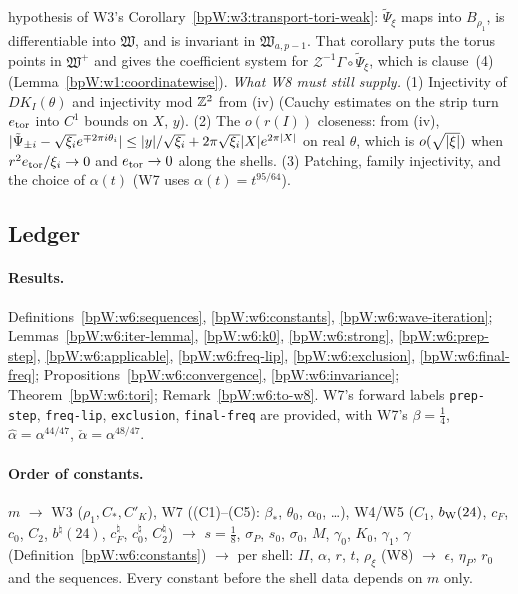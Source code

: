 \begin{remark}
hypothesis of W3's Corollary~\ref{bpW:w3:transport-tori-weak}: $\tilde\Psi_\xi$ maps into $B_{\rho_1}$, is differentiable into $\mathfrak W$,
and is invariant in $\mathfrak W_{a,p-1}$. That corollary puts the torus points in $\mathfrak W^+$ and gives the coefficient system
for $\mathcal Z^{-1}\Gamma\circ\tilde\Psi_\xi$, which is clause~(4) (Lemma~\ref{bpW:w1:coordinatewise}).
\emph{What W8 must still supply.} (1) Injectivity of $D K_I(\theta)$ and injectivity mod
$\mathbb{Z}^2$ from (iv) (Cauchy estimates on the strip turn $e_{\rm tor}$ into $C^1$ bounds on $X$, $y$). (2) The $o(r(I))$ closeness: from (iv),
$\lvert \tilde\Psi_{\pm i}-\sqrt{\xi_i}e^{\mp2\pi i\theta_i}\rvert\le\lvert y\rvert/\sqrt{\xi_i}+2\pi\sqrt{\xi_i}\lvert X\rvert e^{2\pi\lvert X\rvert}$ on real $\theta$, which is
$o(\sqrt{\lvert \xi\rvert})$ when $r^2e_{\rm tor}/\xi_i\to0$ and $e_{\rm tor}\to0$ along the shells. (3) Patching, family injectivity, and the choice
of $\alpha(t)$ (W7 uses $\alpha(t)=t^{95/64}$).
\end{remark}

\subsection{Ledger}\label{bpW:w6:ledger}

\paragraph{Results.} Definitions~\ref{bpW:w6:sequences}, \ref{bpW:w6:constants}, \ref{bpW:w6:wave-iteration};
Lemmas~\ref{bpW:w6:iter-lemma}, \ref{bpW:w6:k0}, \ref{bpW:w6:strong}, \ref{bpW:w6:prep-step}, \ref{bpW:w6:applicable},
\ref{bpW:w6:freq-lip}, \ref{bpW:w6:exclusion}, \ref{bpW:w6:final-freq}; Propositions~\ref{bpW:w6:convergence}, \ref{bpW:w6:invariance};
Theorem~\ref{bpW:w6:tori}; Remark~\ref{bpW:w6:to-w8}. W7's forward labels \texttt{prep-step}, \texttt{freq-lip}, \texttt{exclusion},
\texttt{final-freq} are provided, with W7's $\beta=\frac14$, $\hat\alpha=\alpha^{44/47}$, $\check\alpha=\alpha^{48/47}$.

\paragraph{Order of constants.} $m$ $\to$ W3 ($\rho_1,C_*,C'_K$), W7 ((C1)--(C5): $\beta_*$, $\theta_0$, $\alpha_0$, \dots), W4/W5 ($C_1$, $b_{\rm W}(24)$,
$c_F$, $c_0$, $C_2$, $b^\natural(24)$, $c^\natural_F$, $c^\natural_0$, $C^\natural_2$) $\to$ $s=\frac18$, $\sigma_P$, $s_0$, $\sigma_0$, $M$, $\gamma_0$, $K_0$, $\gamma_1$, $\gamma$ (Definition~\ref{bpW:w6:constants})
$\to$ per shell: $\Pi$, $\alpha$, $r$, $t$, $\rho_\xi$ (W8) $\to$ $\epsilon$, $\eta_P$, $r_0$ and the sequences. Every constant before the shell
data depends on $m$ only.
